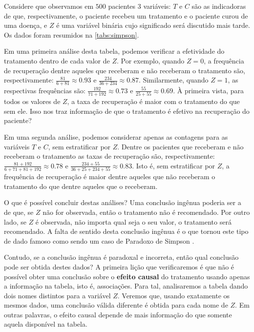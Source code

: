 Considere que observamos em $500$ pacientes $3$ variáveis: 
$T$ e $C$ são as indicadoras de que, respectivamente,
o paciente recebeu um tratamento e o paciente curou de uma doença, e
$Z$ é uma variável binária cujo significado será discutido mais tarde.
Os dados foram resumidos na \cref{tabs:simpson}.

Em uma primeira análise desta tabela, podemos 
verificar a efetividade do tratamento 
dentro de cada valor de $Z$.
Por exemplo, quando $Z=0$,
a frequência de recuperação dentre aqueles que 
receberam e não receberam o tratamento 
são, respectivamente: $\frac{81}{6+81} \approx 0.93$ e
$\frac{234}{36+234} \approx 0.87$.
Similarmente, quando $Z=1$,
as respectivas frequências são:
$\frac{192}{71+192} \approx 0.73$ e
$\frac{55}{25+55} \approx 0.69$.
À primeira vista, para todos os valores de $Z$, a taxa de recuperação 
é maior com o tratamento do que sem ele.
Isso nos traz informação de que 
o tratamento é efetivo na recuperação do paciente?

Em uma segunda análise, podemos considerar
apenas as contagens para as variáveis $T$ e $C$,
sem estratificar por $Z$.
Dentre os pacientes que receberam e não receberam o tratamento
as taxas de recuperação são, respectivamente:
$\frac{81+192}{6+71+81+192} \approx 0.78$ e
$\frac{234+55}{36+25+234+55} \approx 0.83$. Isto é,
sem estratificar por $Z$, a frequência de recuperação é
maior dentre aqueles que não receberam o tratamento
do que dentre aqueles que o receberam.

O que é possível concluir destas análises?
Uma conclusão ingênua poderia ser a de que,
se $Z$ não for observada, então o tratamento não é recomendado.
Por outro lado, se $Z$ é observada, 
não importa qual seja o seu valor, o tratamento será recomendado.
A falta de sentido desta conclusão ingênua é
o que tornou este tipo de dado famoso como sendo
um caso de Paradoxo de Simpson \citep{Simpson1951}.

Contudo, se a conclusão ingênua é paradoxal e incorreta,
então qual conclusão pode ser obtida destes dados?
A primeira lição que verificaremos é que não é possível obter
uma conclusão sobre o \textbf{efeito causal} do tratamento usando
apenas a informação na tabela, isto é, associações.
Para tal, analisaremos a tabela dando 
dois nomes distintos para a variável $Z$.
Veremos que, usando exatamente os mesmos dados,
uma conclusão válida diferente é obtida para cada nome de $Z$.
Em outras palavras, o efeito causal depende de
mais informação do que somente aquela disponível na tabela.

